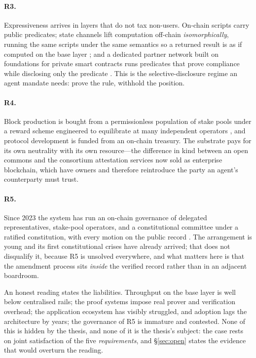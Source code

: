 \documentclass[11pt]{article}
\newcommand{\R}[1]{R#1}
\begin{document}
\paragraph{\R{3}.}
Expressiveness arrives in layers that do not tax non-users. On-chain
scripts carry public predicates; state channels lift computation
off-chain \emph{isomorphically}, running the same scripts under the same
semantics so a returned result is as if computed on the base layer
\citep{chakravarty2021hydra}; and a dedicated partner network built on
foundations for private smart contracts \citep{kerber2021kachina} runs
predicates that prove compliance while disclosing only the predicate
\citep{midnight2024}. This is the selective-disclosure regime an agent
mandate needs: prove the rule, withhold the position.

\paragraph{\R{4}.}
Block production is bought from a permissionless population of stake pools
under a reward scheme engineered to equilibrate at many independent
operators \citep{brunjes2020rewards}, and protocol development is funded
from an on-chain treasury. The substrate pays for its own neutrality with
its own resource---the difference in kind between an open commons and the
consortium attestation services now sold as enterprise blockchain, which
have owners and therefore reintroduce the party an agent's counterparty
must trust.

\paragraph{\R{5}.}
Since 2023 the system has run an on-chain governance of delegated
representatives, stake-pool operators, and a constitutional committee
under a ratified constitution, with every motion on the public record
\citep{cip1694}. The arrangement is young and its first constitutional
crises have already arrived; that does not disqualify it, because \R{5}
is unsolved everywhere, and what matters here is that the amendment
process sits \emph{inside} the verified record rather than in an adjacent
boardroom.

An honest reading states the liabilities. Throughput on the base layer is
well below centralised rails; the proof systems impose real prover and
verification overhead; the application ecosystem has visibly struggled,
and adoption lags the architecture by years; the governance of \R{5} is
immature and contested. None of this is hidden by the thesis, and none of
it is the thesis's subject: the case rests on joint satisfaction of the
five \emph{requirements}, and \S\ref{sec:open} states the evidence that
would overturn the reading.
\end{document}
